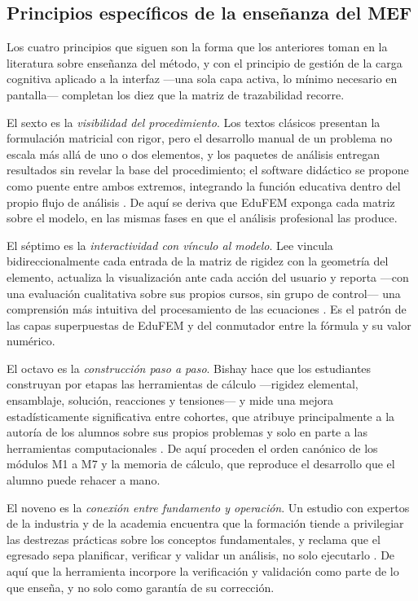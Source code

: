 \subsection{Principios específicos de la enseñanza del MEF}
\label{sec:principios-mef}

Los cuatro principios que siguen son la forma que los anteriores toman en la literatura sobre enseñanza del método, y con el principio de gestión de la carga cognitiva aplicado a la interfaz —una sola capa activa, lo mínimo necesario en pantalla— completan los diez que la matriz de trazabilidad recorre.

El sexto es la \emph{visibilidad del procedimiento}. Los textos clásicos presentan la formulación matricial con rigor, pero el desarrollo manual de un problema no escala más allá de uno o dos elementos, y los paquetes de análisis entregan resultados sin revelar la base del procedimiento; el software didáctico se propone como puente entre ambos extremos, integrando la función educativa dentro del propio flujo de análisis \autocites[p.~157]{lee2015interactive}[p.~872]{lee2015eigenmodes}[p.~2]{bishay2020teaching}. De aquí se deriva que EduFEM exponga cada matriz sobre el modelo, en las mismas fases en que el análisis profesional las produce.

El séptimo es la \emph{interactividad con vínculo al modelo}. Lee vincula bidireccionalmente cada entrada de la matriz de rigidez con la geometría del elemento, actualiza la visualización ante cada acción del usuario y reporta —con una evaluación cualitativa sobre sus propios cursos, sin grupo de control— una comprensión más intuitiva del procesamiento de las ecuaciones \autocites[pp.~158, 163, 166, 168]{lee2015interactive}[p.~874]{lee2015eigenmodes}. Es el patrón de las capas superpuestas de EduFEM y del conmutador entre la fórmula y su valor numérico.

El octavo es la \emph{construcción paso a paso}. Bishay hace que los estudiantes construyan por etapas las herramientas de cálculo —rigidez elemental, ensamblaje, solución, reacciones y tensiones— y mide una mejora estadísticamente significativa entre cohortes, que atribuye principalmente a la autoría de los alumnos sobre sus propios problemas y solo en parte a las herramientas computacionales \autocite[pp.~4-5, 13, 17]{bishay2020teaching}. De aquí proceden el orden canónico de los módulos M1 a M7 y la memoria de cálculo, que reproduce el desarrollo que el alumno puede rehacer a mano.

El noveno es la \emph{conexión entre fundamento y operación}. Un estudio con expertos de la industria y de la academia encuentra que la formación tiende a privilegiar las destrezas prácticas sobre los conceptos fundamentales, y reclama que el egresado sepa planificar, verificar y validar un análisis, no solo ejecutarlo \autocite[pp.~1159, 1168]{perezsantiago2023fem}. De aquí que la herramienta incorpore la verificación y validación como parte de lo que enseña, y no solo como garantía de su corrección.

